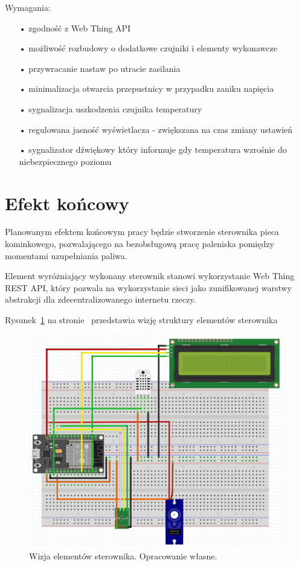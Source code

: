 \documentclass[11pt]{report}
\begin{document}
 Wymagania:
 \begin{enumerate}
 \item[•] zgodność z Web Thing API
 \item[•] możliwość rozbudowy o dodatkowe czujniki i elementy wykonawcze
 \item[•] przywracanie nastaw po utracie zasilania
 \item[•] minimalizacja otwarcia przepustnicy w przypadku zaniku napięcia
 \item[•] sygnalizacja uszkodzenia czujnika temperatury
 \item[•] regulowana jasność wyświetlacza - zwiększana na czas zmiany ustawień
 \item[•] sygnalizator dźwiękowy który informuje gdy temperatura wzrośnie do niebezpiecznego poziomu
 \end{enumerate}
 
 \section{Efekt końcowy}
 Planowanym efektem końcowym pracy będzie stworzenie sterownika pieca kominkowego, pozwalającego na bezobsługową pracę paleniska pomiędzy momentami uzupełniania paliwa.

 Element wyróżniający wykonany sterownik stanowi wykorzystanie Web Thing REST API, który pozwala na wykorzystanie sieci jako zunifikowanej warstwy abstrakcji dla zdecentralizowanego internetu rzeczy.
 
 Rysunek~\ref{fig:wizja} na stronie~\pageref{fig:wizja} przedstawia wizję struktury elementów sterownika
 \begin{figure}[ht]
\centering
\includegraphics[width=0.8 \textwidth]{fig/fritzing_bredboard_v1.png}
\caption{Wizja elementów sterownika. Opracowanie własne.}
\label{fig:wizja}
\end{figure}
 
\end{document}
